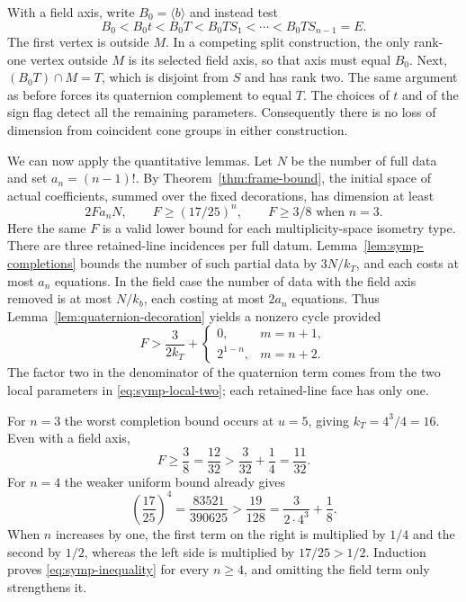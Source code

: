 With a field axis, write $B_0=\langle b\rangle$ and instead test
\begin{equation}\label{eq:symp-detection-field}
B_0<B_0t<B_0T<B_0TS_1<\cdots<B_0TS_{n-1}=E.
\end{equation}
The first vertex is outside $M$.  In a competing split construction,
the only rank-one vertex outside $M$ is its selected field axis, so
that axis must equal $B_0$.  Next,
$(B_0T)\cap M=T$, which is disjoint from $S$ and has rank two.
The same argument as before forces its quaternion complement to
equal $T$.  The choices of $t$ and of the sign flag detect all the
remaining parameters.  Consequently there is no loss of dimension
from coincident cone groups in either construction.

We can now apply the quantitative lemmas.  Let $N$ be the number of
full data and set $a_n=(n-1)!$.  By
Theorem~\ref{thm:frame-bound}, the initial space of actual
coefficients, summed over the fixed decorations, has dimension at
least
\[
2F a_n N,
\qquad
F\geq (17/25)^n,
\qquad F\geq3/8\text{ when }n=3.
\]
Here the same $F$ is a valid lower bound for each multiplicity-space
isometry type.  There are three retained-line incidences per full
datum.  Lemma~\ref{lem:symp-completions} bounds the number of such
partial data by $3N/k_T$, and each costs at most $a_n$ equations.
In the field case the number of data with the field axis removed is
at most $N/k_b$, each costing at most $2a_n$ equations.  Thus
Lemma~\ref{lem:quaternion-decoration} yields a nonzero cycle provided
\begin{equation}\label{eq:symp-inequality}
F>\frac{3}{2k_T}
       +\begin{cases}0,&m=n+1,\\ 2^{1-n},&m=n+2.\end{cases}
\end{equation}
The factor two in the denominator of the quaternion term comes
from the two local parameters in \eqref{eq:symp-local-two}; each
retained-line face has only one.

For $n=3$ the worst completion bound occurs at $u=5$, giving
$k_T=4^3/4=16$.  Even with a field axis,
\begin{equation}\label{eq:symp-smallest}
F\geq\frac38=\frac{12}{32}
   >\frac3{32}+\frac14=\frac{11}{32}.
\end{equation}
For $n=4$ the weaker uniform bound already gives
\[
\left(\frac{17}{25}\right)^4
 =\frac{83521}{390625}
 >\frac{19}{128}
 =\frac{3}{2\cdot4^3}+\frac18.
\]
When $n$ increases by one, the first term on the right is multiplied
by $1/4$ and the second by $1/2$, whereas the left side is
multiplied by $17/25>1/2$.  Induction proves
\eqref{eq:symp-inequality} for every $n\geq4$, and omitting the
field term only strengthens it.

